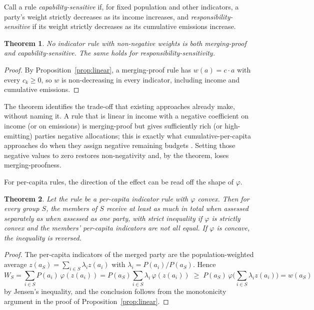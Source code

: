 \documentclass[11pt]{article}
\newtheorem{theorem}{Theorem}
\theoremstyle{definition}
\theoremstyle{remark}
\begin{document}
Call a rule \emph{capability-sensitive} if, for fixed population and other indicators, a party's weight strictly decreases as its income increases, and \emph{responsibility-sensitive} if its weight strictly decreases as its cumulative emissions increase.

\begin{theorem}\label{thm:impossibility}
No indicator rule with non-negative weights is both merging-proof and capability-sensitive. The same holds for responsibility-sensitivity.
\end{theorem}

\begin{proof}
By Proposition~\ref{prop:linear}, a merging-proof rule has $w(a)=c\cdot a$ with every $c_k\ge 0$, so $w$ is non-decreasing in every indicator, including income and cumulative emissions.
\end{proof}

The theorem identifies the trade-off that existing approaches already make, without naming it. A rule that is linear in income with a negative coefficient on income (or on emissions) is merging-proof but gives sufficiently rich (or high-emitting) parties negative allocations; this is exactly what cumulative-per-capita approaches do when they assign negative remaining budgets \cite{rdp2023}. Setting those negative values to zero restores non-negativity and, by the theorem, loses merging-proofness.

For per-capita rules, the direction of the effect can be read off the shape of $\varphi$.

\begin{theorem}\label{thm:convex}
Let the rule be a per-capita indicator rule with $\varphi$ convex. Then for every group $S$, the members of $S$ receive at least as much in total when assessed separately as when assessed as one party, with strict inequality if $\varphi$ is strictly convex and the members' per-capita indicators are not all equal. If $\varphi$ is concave, the inequality is reversed.
\end{theorem}

\begin{proof}
The per-capita indicators of the merged party are the population-weighted average $z(a_S)=\sum_{i\in S}\lambda_i z(a_i)$ with $\lambda_i=P(a_i)/P(a_S)$. Hence
\[
W_S=\sum_{i\in S}P(a_i)\,\varphi(z(a_i)) = P(a_S)\sum_{i\in S}\lambda_i\,\varphi(z(a_i)) \;\ge\; P(a_S)\,\varphi\!\Big(\sum_{i\in S}\lambda_i z(a_i)\Big)=w(a_S)
\]
by Jensen's inequality, and the conclusion follows from the monotonicity argument in the proof of Proposition~\ref{prop:linear}.
\end{proof}
\end{document}
